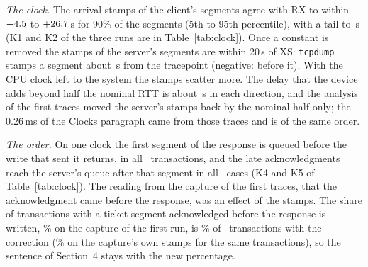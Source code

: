 \documentclass[9pt]{article}
\newcommand{\ms}{\,ms\xspace}
\begin{document}
\emph{The clock.} The arrival stamps of the client's segments agree with RX to within $-4.5$ to $+26.7$\,\textmu s for 90\% of the segments (5th to 95th percentile), with a tail to \RpKOneMax\,\textmu s (K1 and K2 of the three runs are in Table~\ref{tab:clock}). Once a constant is removed the stamps of the server's segments are within 20\,\textmu s of XS: \texttt{tcpdump} stamps a segment about \RpKTwoMed\,\textmu s from the tracepoint (negative: before it). With the CPU clock left to the system the stamps scatter more. The delay that the device adds beyond half the nominal RTT is about \RpKThreeMed\,\textmu s in each direction, and the analysis of the first traces moved the server's stamps back by the nominal half only; the 0.26\ms of the Clocks paragraph came from those traces and is of the same order.

\emph{The order.} On one clock the first segment of the response is queued before the write that sent it returns, in all \RpKFourN\ transactions, and the late acknowledgments reach the server's queue after that segment in all \RpKFiveN\ cases (K4 and K5 of Table~\ref{tab:clock}). The reading from the capture of the first traces, that the acknowledgment came before the response, was an effect of the stamps. The share of transactions with a ticket segment acknowledged before the response is written, \RaceBeforePct\% on the capture of the first run, is \RpKSixPct\% of \RpKSixN\ transactions with the correction (\RpKSixCapPct\% on the capture's own stamps for the same transactions), so the sentence of Section~4 stays with the new percentage.
\end{document}
